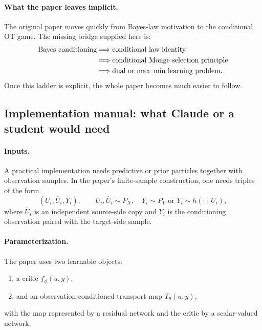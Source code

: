 \documentclass[11pt]{report}
\begin{document}
\paragraph{What the paper leaves implicit.}
The original paper moves quickly from Bayes-law motivation to the conditional OT
game.  The missing bridge supplied here is:
\begin{align}
\text{Bayes conditioning}
&\Longrightarrow
\text{conditional law identity}
\notag\\
&\Longrightarrow
\text{conditional Monge selection principle}
\notag\\
&\Longrightarrow
\text{dual or max--min learning problem}.
\label{eq:aljarrah-logic-chain}
\end{align}
Once this ladder is explicit, the whole paper becomes much easier to follow.

\subsection*{Implementation manual: what Claude or a student would need}

\paragraph{Inputs.}
A practical implementation needs predictive or prior particles together with
observation samples.  In the paper's finite-sample construction, one needs
triples of the form
\begin{equation}
(U_i,\overline U_i,Y_i),
\qquad
U_i,\overline U_i \sim P_X,
\quad
Y_i\sim P_Y
\text{ or }Y_i\sim h(\cdot\mid U_i),
\label{eq:aljarrah-training-triples}
\end{equation}
where $\overline U_i$ is an independent source-side copy and $Y_i$ is the
conditioning observation paired with the target-side sample.

\paragraph{Parameterization.}
The paper uses two learnable objects:
\begin{enumerate}[label=(\roman*)]
  \item a critic $f_\phi(u,y)$,
  \item and an observation-conditioned transport map $T_\theta(u,y)$,
\end{enumerate}
with the map represented by a residual network and the critic by a scalar-valued
network.
\end{document}
